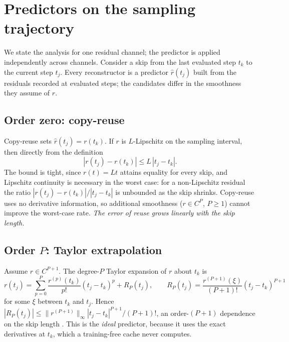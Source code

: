 \section{Predictors on the sampling trajectory}\label{sec:respect-hierarchy}

We state the analysis for one residual channel; the predictor is applied independently across channels. Consider a skip from the last evaluated step $t_k$ to the current step $t_j$. Every reconstructor is a predictor $\hat r(t_j)$ built from the residuals recorded at evaluated steps; the candidates differ in the smoothness they assume of $r$.

\subsection{Order zero: copy-reuse}
Copy-reuse sets $\hat r(t_j)=r(t_k)$. If $r$ is $L$-Lipschitz on the sampling interval, then directly from the definition
\begin{equation}\label{eq:respect-reuse}
  |r(t_j)-r(t_k)| \le L\,|t_j-t_k| .
\end{equation}
The bound is tight, since $r(t)=Lt$ attains equality for every skip, and Lipschitz continuity is necessary in the worst case: for a non-Lipschitz residual the ratio $|r(t_j)-r(t_k)|/|t_j-t_k|$ is unbounded as the skip shrinks. Copy-reuse uses no derivative information, so additional smoothness ($r\in C^P$, $P\ge 1$) cannot improve the worst-case rate. \emph{The error of reuse grows linearly with the skip length.}

\subsection{Order $P$: Taylor extrapolation}
Assume $r\in C^{P+1}$. The degree-$P$ Taylor expansion of $r$ about $t_k$ is
\begin{equation}
  r(t_j) = \sum_{p=0}^{P}\frac{r^{(p)}(t_k)}{p!}(t_j-t_k)^p + R_P(t_j), \qquad R_P(t_j) = \frac{r^{(P+1)}(\xi)}{(P+1)!}(t_j-t_k)^{P+1}
\end{equation}
for some $\xi$ between $t_k$ and $t_j$. Hence $|R_P(t_j)|\le \|r^{(P+1)}\|_\infty |t_j-t_k|^{P+1}/(P+1)!$, an order-$(P{+}1)$ dependence on the skip length \citep[Thm.~3.1]{han2026spectrum}. This is the \emph{ideal} predictor, because it uses the exact derivatives at $t_k$, which a training-free cache never computes.

